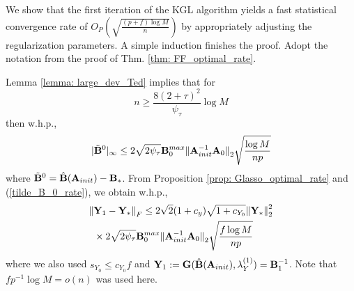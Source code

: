 \begin{IEEEproof}
We show that the first iteration of the KGL algorithm yields a fast statistical convergence rate of $O_P\left( \sqrt{\frac{(p+f)\log M}{n}} \right)$ by appropriately adjusting the regularization parameters. A simple induction finishes the proof. Adopt the notation from the proof of Thm. \ref{thm: FF_optimal_rate}.

Lemma \ref{lemma: large_dev_Ted} implies that for
\begin{equation} \label{condition_0}
	n \geq \frac{8(2+\tau)^2}{\psi_{\tau}} \log M
\end{equation}
then w.h.p.,
\begin{equation} \label{tilde_B_0_rate}
	|\tilde{{\mathbf{B}}}^0|_\infty \leq 2\sqrt{2\psi_\tau} {\mathbf{B}}_0^{max} { \parallel }{\mathbf{A}}_{init}^{-1} {\mathbf{A}}_0{ \parallel }_2 \sqrt{\frac{\log M}{np}}
\end{equation}
where $\tilde{{\mathbf{B}}}^0=\hat{{\mathbf{B}}}({\mathbf{A}}_{init})-{\mathbf{B}}_*$. From Proposition \ref{prop: Glasso_optimal_rate} and (\ref{tilde_B_0_rate}), we obtain w.h.p.,
\begin{align}
	{ \parallel } & {\mathbf{Y}}_1-{\mathbf{Y}}_* { \parallel }_F \leq 2\sqrt{2} (1+c_y) \sqrt{1+c_{Y_0}} { \parallel } {\mathbf{Y}}_*{ \parallel }_2^2 \nonumber \\
		&\times 2\sqrt{2\psi_\tau} {\mathbf{B}}_0^{max} { \parallel }{\mathbf{A}}_{init}^{-1} {\mathbf{A}}_0{ \parallel }_2 \sqrt{\frac{f\log M}{np}} \label{Y_Frob_error}
\end{align}
where we also used $s_{Y_0}\leq c_{Y_0} f$ and ${\mathbf{Y}}_1:={\mathbf{G}}(\hat{{\mathbf{B}}}({\mathbf{A}}_{init}),\lambda_Y^{(1)})={\mathbf{B}}_1^{-1}$. Note that $fp^{-1}\log M=o(n)$ was used here.


\end{IEEEproof}
